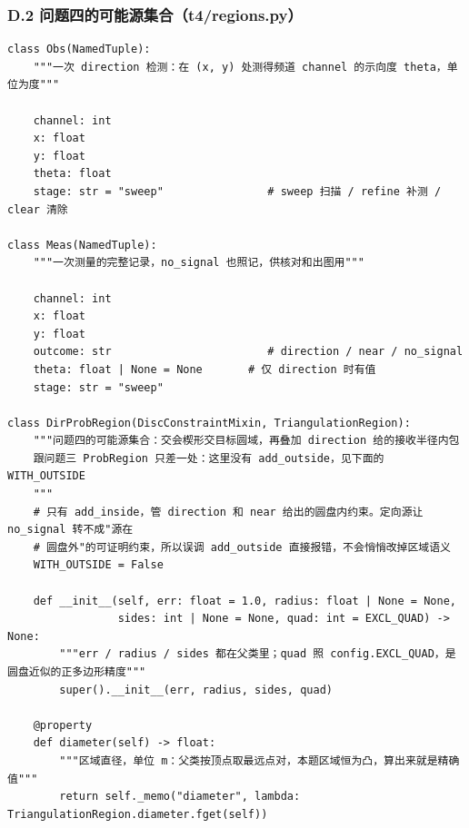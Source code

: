 \documentclass[UTF8, zihao=5,AutoFakeBold=2]{ctexart}
\begin{document}
	\subsubsection*{D.2 \quad 问题四的可能源集合（t4/regions.py）}
	\begin{lstlisting}
class Obs(NamedTuple):
    """一次 direction 检测：在 (x, y) 处测得频道 channel 的示向度 theta，单位为度"""

    channel: int
    x: float
    y: float
    theta: float
    stage: str = "sweep"                # sweep 扫描 / refine 补测 / clear 清除

class Meas(NamedTuple):
    """一次测量的完整记录，no_signal 也照记，供核对和出图用"""

    channel: int
    x: float
    y: float
    outcome: str                        # direction / near / no_signal
    theta: float | None = None       # 仅 direction 时有值
    stage: str = "sweep"

class DirProbRegion(DiscConstraintMixin, TriangulationRegion):
    """问题四的可能源集合：交会楔形交目标圆域，再叠加 direction 给的接收半径内包
    跟问题三 ProbRegion 只差一处：这里没有 add_outside，见下面的 WITH_OUTSIDE
    """
    # 只有 add_inside，管 direction 和 near 给出的圆盘内约束。定向源让 no_signal 转不成"源在
    # 圆盘外"的可证明约束，所以误调 add_outside 直接报错，不会悄悄改掉区域语义
    WITH_OUTSIDE = False

    def __init__(self, err: float = 1.0, radius: float | None = None,
                 sides: int | None = None, quad: int = EXCL_QUAD) -> None:
        """err / radius / sides 都在父类里；quad 照 config.EXCL_QUAD，是圆盘近似的正多边形精度"""
        super().__init__(err, radius, sides, quad)

    @property
    def diameter(self) -> float:
        """区域直径，单位 m：父类按顶点取最远点对，本题区域恒为凸，算出来就是精确值"""
        return self._memo("diameter", lambda: TriangulationRegion.diameter.fget(self))
	\end{lstlisting}
\end{document}
